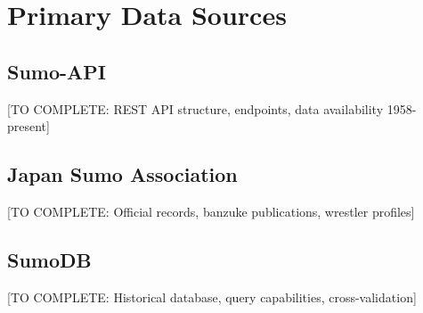 \section{Primary Data Sources}

\subsection{Sumo-API}

[TO COMPLETE: REST API structure, endpoints, data availability 1958-present]

\subsection{Japan Sumo Association}

[TO COMPLETE: Official records, banzuke publications, wrestler profiles]

\subsection{SumoDB}

[TO COMPLETE: Historical database, query capabilities, cross-validation]